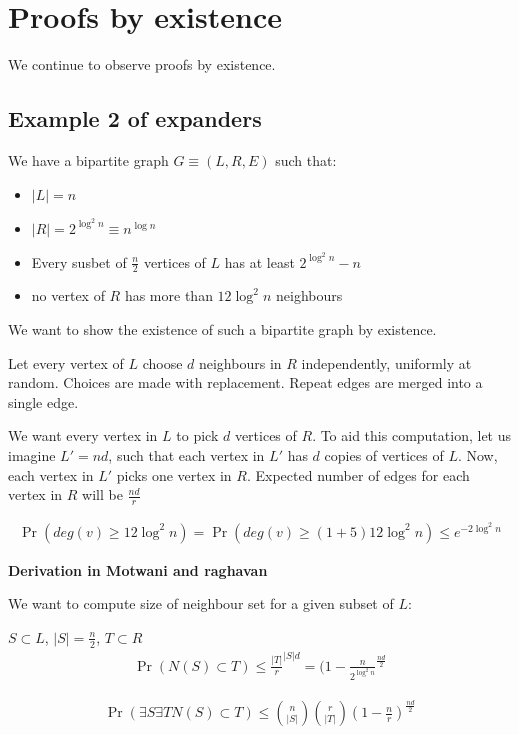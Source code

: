 \chapter{Proofs by existence}

We continue to observe proofs by existence. 

\section{Example 2 of expanders}
We have a bipartite graph $G \equiv (L, R, E)$ such that:
\begin{itemize}
\item $|L| = n$
\item $|R| = 2^{\log^2 n} \equiv n^{\log n}$
\item Every susbet of $\frac{n}{2}$ vertices of $L$ has at least $2^{\log^2 n} - n$
\item no vertex of $R$ has more than $12 \log^2 n$ neighbours
\end{itemize}

We want to show the existence of such a bipartite graph by existence.

Let every vertex of $L$ choose $d$ neighbours in $R$ independently,
uniformly at random. Choices are made with replacement. Repeat edges are
merged into a single edge.


We want every vertex in $L$ to pick $d$ vertices of $R$. To aid this
computation, let us imagine $L' = nd$, such that each vertex in $L'$ has
$d$ copies of vertices of $L$. Now, each vertex in $L'$ picks one vertex in $R$.
Expected number of edges for each vertex in $R$ will be $\frac{n d}{r}$

\begin{align*}
    \Pr(deg(v) \geq 12 \log^2 n) = \Pr(deg(v) \geq (1 + 5)12 \log^2 n) \leq e^{-2 \log^2 n}
\end{align*}

\textbf{Derivation in Motwani and raghavan}

We want to compute size of neighbour set for a given subset of $L$:

$S \subset L$, $|S| = \frac{n}{2}$, $T \subset R$
\begin{align*}
    \Pr(N(S) \subset T) \leq \frac{|T|}{r}^{|S| d} = (1 - \frac{n}{2^{\log^2 n}}^\frac{nd}{2}
\end{align*}


\begin{align*}
    \Pr(\exists S \exists T N(S) \subset T) \leq {n \choose |S|} {r \choose |T|} (1 - \frac{n}{r})^\frac{nd}{2}
\end{align*}

